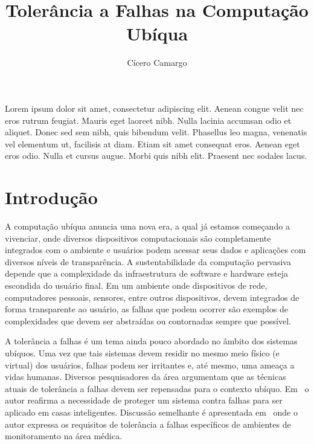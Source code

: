 \documentclass{SBCbookchapter}
\title{Tolerância a Falhas na Computação Ubíqua}
\author{Cícero Camargo}
\begin{document}
\maketitle


\begin{resumo}


Lorem ipsum dolor sit amet, consectetur adipiscing elit. Aenean congue velit nec eros rutrum feugiat. Mauris eget laoreet nibh. Nulla lacinia accumsan odio et aliquet. Donec sed sem nibh, quis bibendum velit. Phasellus leo magna, venenatis vel elementum ut, facilisis at diam. Etiam sit amet consequat eros. Aenean eget eros odio. Nulla et cursus augue. Morbi quis nibh elit. Praesent nec sodales lacus.
	

\end{resumo}

\section{Introdução} %

A computação ubíqua anuncia uma nova era, a qual já estamos começando a vivenciar, onde diversos dispositivos computacionais são completamente integrados com o ambiente e usuários podem acessar seus dados e aplicações com diversos níveis de transparência. A sustentabilidade da computação pervasiva depende que a complexidade da infraestrutura de software e hardware esteja escondida do usuário final. Em um ambiente onde dispositivos de rede, computadores pessoais, sensores, entre outros dispositivos, devem integrados de forma transparente ao usuário, as falhas que podem ocorrer são exemplos de complexidades que devem ser abstraídas ou contornadas sempre que possível.

A tolerância a falhas é um tema ainda pouco abordado no âmbito dos sistemas ubíquos. Uma vez que tais sistemas devem residir no mesmo meio físico (e virtual) dos usuários, falhas podem ser irritantes e, até mesmo, uma ameaça a vidas humanas. Diversos pesquisadores da área argumentam que as técnicas atuais de tolerância a falhas devem ser repensadas para o contexto ubíquo. Em~\cite{Banavar2000} o autor reafirma a necessidade de proteger um sistema contra falhas para ser aplicado em casas inteligentes. Discussão semelhante é apresentada em~\cite{Bohn02} onde o autor expressa os requisitos de tolerância a falhas específicos de ambientes de monitoramento na área médica. %
\end{document}
